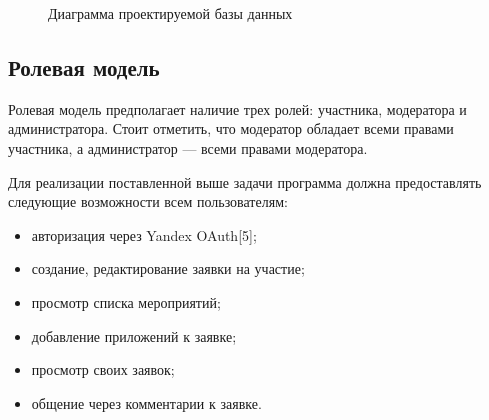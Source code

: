 \begin{figure}[h!]
	\caption{Диаграмма проектируемой базы данных}
	\label{fig:er-2}
\end{figure}

\subsection{Ролевая модель}

Ролевая модель предполагает наличие трех ролей: участника, модератора и администратора. Стоит отметить, что модератор обладает всеми правами участника, а администратор --- всеми правами модератора.

Для реализации поставленной выше задачи программа должна предоставлять следующие возможности всем пользователям:
\begin{itemize}[label=---]
	\item авторизация через Yandex OAuth[5];
	\item создание, редактирование заявки на участие;
	\item просмотр списка мероприятий;
	\item добавление приложений к заявке;
	\item просмотр своих заявок;
	\item общение через комментарии к заявке.
\end{itemize}

